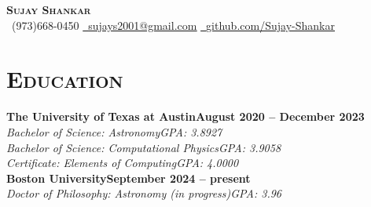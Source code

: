 \documentclass[11pt]{article}
\begin{document}
\begin{center}
    {\Huge \textbf{\textsc{Sujay Shankar}}} \\ \vspace{2pt}
    \faPhoneSquare~(973)668-0450 \hspace{5pt}
    \faEnvelopeSquare\href{mailto:sujays2001@gmail.com}{~\underline{sujays2001@gmail.com}} \hspace{5pt}
    \faGithubSquare\href{https://github.com/Sujay-Shankar}{~\underline{github.com/Sujay-Shankar}}
\end{center}

\section{\textsc{Education}}
\normalsize\textbf{The University of Texas at Austin}\hfill\small\textbf{August 2020 -- December 2023}
\\ \textit{Bachelor of Science: Astronomy\hfill GPA: 3.8927}
\\ \textit{Bachelor of Science: Computational Physics\hfill GPA: 3.9058}
\\ \textit{Certificate: Elements of Computing\hfill GPA: 4.0000} \vspace{5pt}
\\ \normalsize\textbf{Boston University}\hfill\small\textbf{September 2024 -- present}
\\ \textit{Doctor of Philosophy: Astronomy (in progress)\hfill GPA: 3.96}
\end{document}
